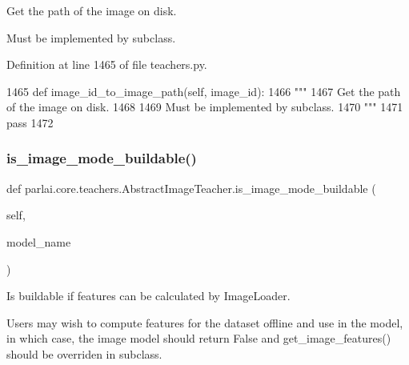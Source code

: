 \begin{DoxyVerb}Get the path of the image on disk.

Must be implemented by subclass.
\end{DoxyVerb}
 

Definition at line 1465 of file teachers.\+py.


\begin{DoxyCode}
1465     \textcolor{keyword}{def }image\_id\_to\_image\_path(self, image\_id):
1466         \textcolor{stringliteral}{"""}
1467 \textcolor{stringliteral}{        Get the path of the image on disk.}
1468 \textcolor{stringliteral}{}
1469 \textcolor{stringliteral}{        Must be implemented by subclass.}
1470 \textcolor{stringliteral}{        """}
1471         \textcolor{keywordflow}{pass}
1472 
\end{DoxyCode}
\mbox{\label{classparlai_1_1core_1_1teachers_1_1AbstractImageTeacher_a16c2be0ffe61e136dea2a63cbd918af5}} 
\subsubsection{\texorpdfstring{is\+\_\+image\+\_\+mode\+\_\+buildable()}{is\_image\_mode\_buildable()}}
{\footnotesize\ttfamily def parlai.\+core.\+teachers.\+Abstract\+Image\+Teacher.\+is\+\_\+image\+\_\+mode\+\_\+buildable (\begin{DoxyParamCaption}\item[{}]{self,  }\item[{}]{model\+\_\+name }\end{DoxyParamCaption})}

\begin{DoxyVerb}Is buildable if features can be calculated by ImageLoader.

Users may wish to compute features for the dataset offline and use in the model,
in which case, the image model should return False and get_image_features()
should be overriden in subclass.
\end{DoxyVerb}
 

